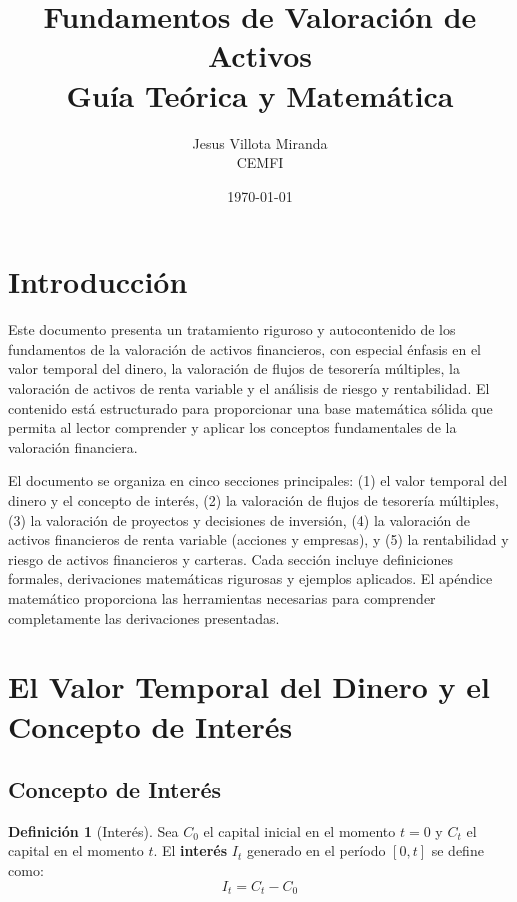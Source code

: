 \documentclass[12pt,a4paper]{article}
\title{\textbf{Fundamentos de Valoración de Activos}\\
\large Guía Teórica y Matemática}
\author{Jesus Villota Miranda\\
CEMFI}
\date{\today}
\theoremstyle{definition}
\newtheorem{definicion}{Definición}[section]
\begin{document}
\maketitle

\tableofcontents
\newpage

\section{Introducción}

Este documento presenta un tratamiento riguroso y autocontenido de los fundamentos de la valoración de activos financieros, con especial énfasis en el valor temporal del dinero, la valoración de flujos de tesorería múltiples, la valoración de activos de renta variable y el análisis de riesgo y rentabilidad. El contenido está estructurado para proporcionar una base matemática sólida que permita al lector comprender y aplicar los conceptos fundamentales de la valoración financiera.

El documento se organiza en cinco secciones principales: (1) el valor temporal del dinero y el concepto de interés, (2) la valoración de flujos de tesorería múltiples, (3) la valoración de proyectos y decisiones de inversión, (4) la valoración de activos financieros de renta variable (acciones y empresas), y (5) la rentabilidad y riesgo de activos financieros y carteras. Cada sección incluye definiciones formales, derivaciones matemáticas rigurosas y ejemplos aplicados. El apéndice matemático proporciona las herramientas necesarias para comprender completamente las derivaciones presentadas.

\section{El Valor Temporal del Dinero y el Concepto de Interés}

\subsection{Concepto de Interés}

\begin{definicion}[Interés]
Sea $C_0$ el capital inicial en el momento $t=0$ y $C_t$ el capital en el momento $t$. El \textbf{interés} $I_t$ generado en el período $[0,t]$ se define como:
\begin{equation}
I_t = C_t - C_0
\end{equation}
\end{definicion}
\end{document}
